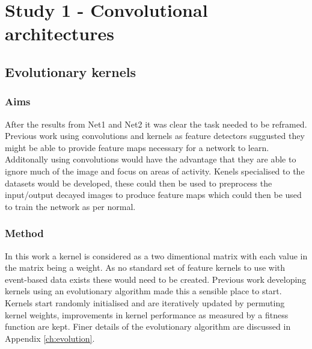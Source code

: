\chapter{Study 1 - Convolutional architectures}
\label{ch:convolutions}

\section{Evolutionary kernels}

\subsection{Aims}
After the results from Net1 and Net2 it was clear the task needed to be reframed.
Previous work using convolutions and kernels as feature detectors suggusted they might be able to provide feature maps necessary for a network to learn.
Additonally using convolutions would have the advantage that they are able to ignore much of the image and focus on areas of activity.  
Kenels specialised to the datasets would be developed, these could then be used to preprocess the input/output decayed images to produce feature maps which could then be used to train the network as per normal.


\subsection{Method}
In this work a kernel is considered as a two dimentional matrix with each value in the matrix being a weight.
As no standard set of feature kernels to use with event-based data exists these would need to be created.
Previous work developing kernels using an evolutionary algorithm made this a sensible place to start.
Kernels start randomly initialised and are iteratively updated by permuting kernel weights, improvements in kernel performance as measured by a fitness function are kept.
Finer details of the evolutionary algorithm are discussed in Appendix \ref{ch:evolution}.

